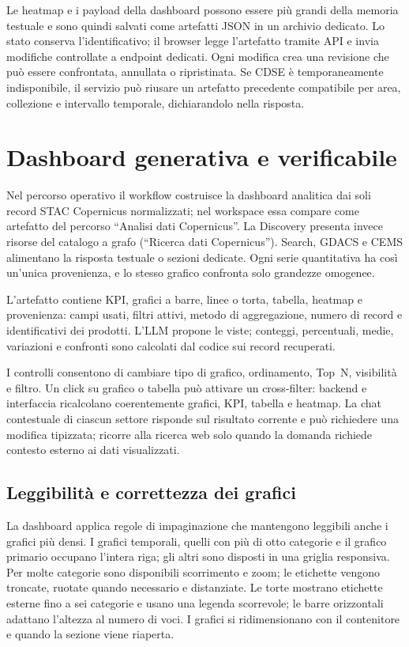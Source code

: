 Le heatmap e i payload della dashboard possono essere più grandi della memoria
testuale e sono quindi salvati come artefatti JSON in un archivio dedicato. Lo
stato conserva l'identificativo; il browser legge l'artefatto tramite API e
invia modifiche controllate a endpoint dedicati. Ogni modifica crea una
revisione che può essere confrontata, annullata o ripristinata. Se CDSE è
temporaneamente indisponibile, il servizio può riusare un artefatto precedente
compatibile per area, collezione e intervallo temporale, dichiarandolo
nella risposta.

\section{Dashboard generativa e verificabile}

Nel percorso operativo il workflow costruisce la dashboard analitica dai soli
record STAC Copernicus normalizzati; nel workspace essa compare come artefatto
del percorso ``Analisi dati Copernicus''. La Discovery presenta invece risorse
del catalogo a grafo (``Ricerca dati Copernicus''). Search, GDACS e CEMS
alimentano la risposta testuale o sezioni dedicate. Ogni serie quantitativa ha
così un'unica provenienza, e lo stesso grafico confronta solo grandezze
omogenee.

L'artefatto contiene KPI, grafici a barre, linee o torta, tabella, heatmap e
provenienza: campi usati, filtri attivi, metodo di aggregazione, numero di
record e identificativi dei prodotti. L'LLM propone le viste; conteggi,
percentuali, medie, variazioni e confronti sono calcolati dal codice sui record
recuperati.

I controlli consentono di cambiare tipo di grafico, ordinamento, Top~N,
visibilità e filtro. Un click su grafico o tabella può attivare un
cross-filter: backend e interfaccia ricalcolano coerentemente grafici, KPI,
tabella e heatmap. La chat contestuale di ciascun settore risponde sul
risultato corrente e può richiedere una modifica tipizzata; ricorre alla
ricerca web solo quando la domanda richiede contesto esterno ai dati
visualizzati.

\subsection{Leggibilità e correttezza dei grafici}
\label{subsec:leggibilita-grafici}

La dashboard applica regole di impaginazione che mantengono leggibili anche i
grafici più densi. I grafici temporali, quelli con più di otto categorie e il
grafico primario occupano l'intera riga; gli altri sono disposti in una griglia
responsiva. Per molte categorie sono disponibili scorrimento e zoom; le
etichette vengono troncate, ruotate quando necessario e distanziate. Le torte
mostrano etichette esterne fino a sei categorie e usano una legenda scorrevole;
le barre orizzontali adattano l'altezza al numero di voci. I grafici si
ridimensionano con il contenitore e quando la sezione viene riaperta.

